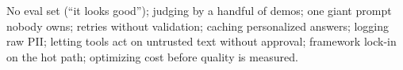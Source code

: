 \begin{trap}
No eval set (``it looks good''); judging by a handful of demos; one giant prompt nobody owns; retries without validation; caching personalized answers; logging raw PII; letting tools act on untrusted text without approval; framework lock-in on the hot path; optimizing cost before quality is measured.
\end{trap}
